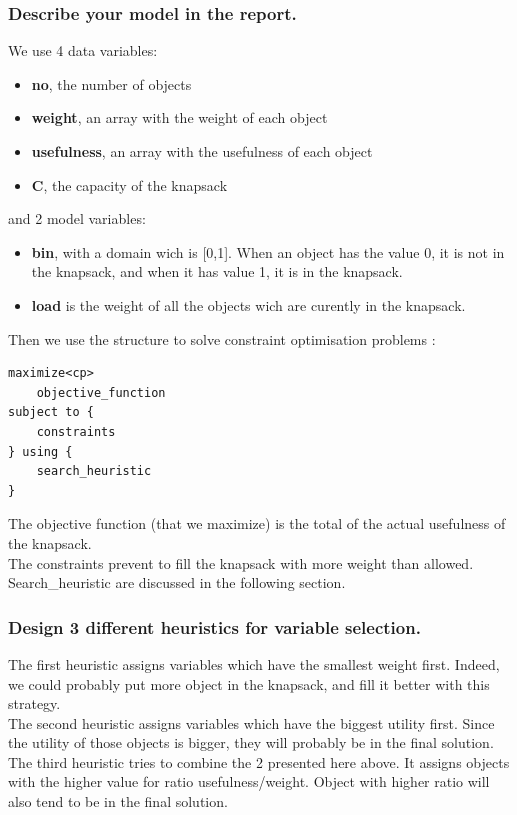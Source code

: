 \documentclass[a4paper ,12pt,french]{article}
\begin{document}
\subsubsection{Describe your model in the report.}

We use 4 data variables: 
\begin{itemize}
\item \textbf{no}, the number of objects
\item \textbf{weight}, an array with the weight of each object
\item \textbf{usefulness}, an array with the usefulness of each object
\item \textbf{C}, the capacity of the knapsack\\
\end{itemize}

and 2 model variables:
\begin{itemize}
\item \textbf{bin}, with a domain wich is [0,1]. When an object has the value 0, it is not in the knapsack, and when it has value 1, it is in the knapsack.
\item \textbf{load} is the weight of all the objects wich are curently in the knapsack.\\
\end{itemize}

Then we use the structure to solve constraint optimisation problems :
\begin{verbatim}
maximize<cp>
    objective_function
subject to {
    constraints
} using {
    search_heuristic
}
\end{verbatim}

The objective function (that we maximize) is the total of the actual usefulness of the knapsack.\\
The constraints prevent to fill the knapsack with more weight than allowed.\\
Search\_heuristic are discussed in the following section.



\subsubsection{Design 3 different heuristics for variable selection.}
The first heuristic assigns variables which have the smallest weight first. Indeed, we could probably put more object in the knapsack, and fill it better with this strategy.\\
The second heuristic assigns variables which have the biggest utility first. Since the utility of those objects is bigger, they will probably be in the final solution.\\
The third heuristic tries to combine the 2 presented here above. It assigns objects with the higher value for ratio usefulness/weight. Object with higher ratio will also tend to be in the final solution.\\
\end{document}
